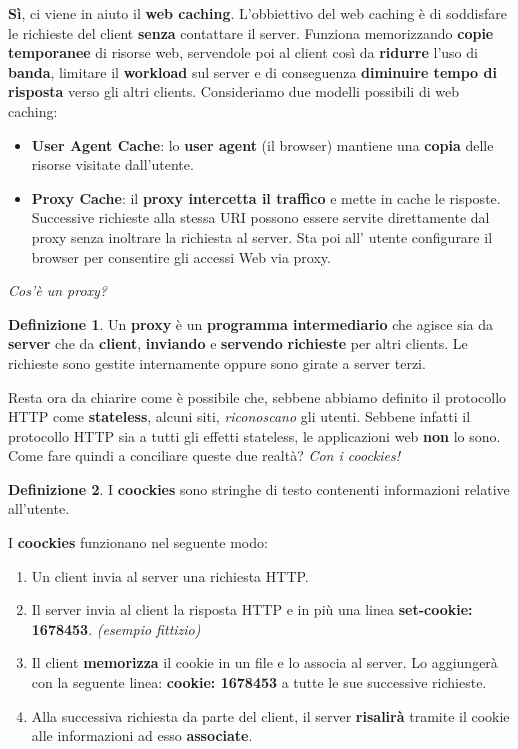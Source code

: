 \documentclass[11pt,a4paper]{article}
\theoremstyle{definition}
\newtheorem{definition}{Definizione}[section]
\begin{document}
\textbf{Sì}, ci viene in aiuto il \textbf{web caching}. L'obbiettivo del web caching è di soddisfare le richieste del client \textbf{senza} contattare il server. Funziona memorizzando \textbf{copie temporanee} di risorse web, servendole poi al client così da \textbf{ridurre} l’uso di \textbf{banda}, limitare il \textbf{workload} sul server e di conseguenza \textbf{diminuire tempo di risposta} verso gli altri clients.\newline
Consideriamo due modelli possibili di web caching:
\begin{itemize}
	\item \textbf{User Agent Cache}: lo \textbf{user agent} (il browser) mantiene una \textbf{copia} delle risorse visitate dall’utente.
	\item \textbf{Proxy Cache}: il \textbf{proxy intercetta il traffico} e mette in cache le risposte. Successive richieste alla stessa URI possono essere servite direttamente dal proxy senza inoltrare la richiesta al server. Sta poi all' utente configurare il browser per consentire gli accessi Web via proxy.
\end{itemize}

\textit{Cos'è un proxy?}
\theoremstyle{definition}
\begin{definition}
	Un \textbf{proxy} è un \textbf{programma intermediario} che agisce sia da \textbf{server} che da \textbf{client}, \textbf{inviando} e \textbf{servendo} \textbf{richieste} per altri clients. Le richieste sono gestite internamente oppure sono girate a server terzi.
\end{definition}
Resta ora da chiarire come è possibile che, sebbene abbiamo definito il protocollo HTTP come \textbf{stateless}, alcuni siti, \textit{riconoscano} gli utenti.\newline
Sebbene infatti il protocollo HTTP sia a tutti gli effetti stateless, le applicazioni web \textbf{non} lo sono. Come fare quindi a conciliare queste due realtà?\newline\newline
\textit{Con i coockies!}
\begin{definition}
	I \textbf{coockies} sono stringhe di testo contenenti informazioni relative all'utente.
\end{definition}
I \textbf{coockies} funzionano nel seguente modo:
\begin{enumerate}
	\item Un client invia al server una richiesta HTTP.
	\item Il server invia al client la risposta HTTP e in più una linea \textbf{set-cookie: 1678453}. \textit{(esempio fittizio)}
	\item Il client \textbf{memorizza} il cookie in un file e lo associa al server.
	      Lo aggiungerà con la seguente linea: \textbf{cookie: 1678453} a tutte le sue successive richieste.
	\item Alla successiva richiesta da parte del client, il server \textbf{risalirà} tramite il cookie alle informazioni ad esso \textbf{associate}.
\end{enumerate}
\end{document}
